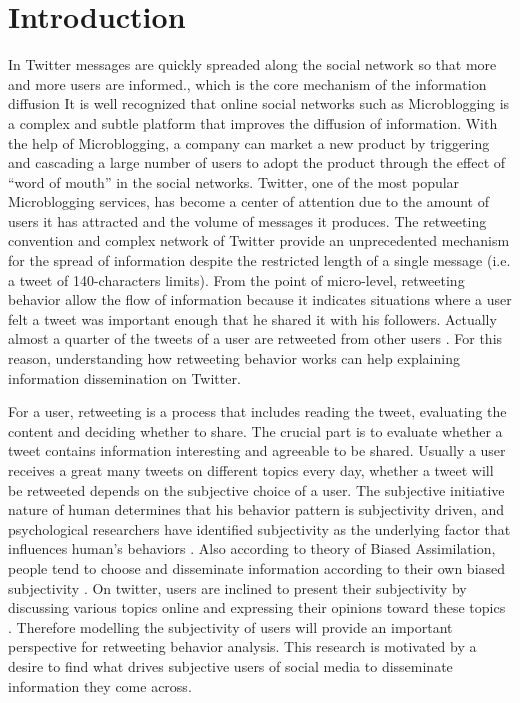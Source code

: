 \documentclass{acm_proc_article-sp}
\begin{document}
\section{Introduction}
\label{introduction}
\noindent 
In Twitter messages are quickly spreaded along the social network so that more and more users are informed., which is the core mechanism of the information diffusion
It is well recognized that online social networks such as Microblogging is a complex and subtle platform that improves the diffusion of information. With the help of Microblogging, a company can market a new product by triggering and cascading a large number of users to adopt the product through the effect of ``word of mouth'' in the social networks. Twitter, one of the most popular Microblogging services, has become a center of attention due to the amount of users it has attracted and the volume of messages it produces. 
The retweeting convention and complex network of Twitter provide an unprecedented mechanism for the spread of information despite the restricted length of a single message (i.e. a tweet of 140-characters limits). From the point of micro-level, retweeting behavior allow the flow of information because it indicates situations where a user felt a tweet was important enough that he shared it with his followers. Actually almost a quarter of the tweets of a user are retweeted from other users \cite{yang2010understanding}. For this reason, understanding how retweeting behavior works can help explaining information dissemination on Twitter.

For a user, retweeting is a process that includes reading the tweet, evaluating the content and deciding whether to share. The crucial part is to evaluate whether a tweet contains information interesting and agreeable to be shared. Usually a user receives a great many tweets on different topics every day, whether a tweet will be retweeted depends on the subjective choice of a user. The subjective initiative nature of human determines that his behavior pattern is subjectivity driven, and psychological researchers have identified subjectivity as the underlying factor that influences human's behaviors \cite{moore2008awareness}. Also according to theory of Biased Assimilation, people tend to choose and disseminate information according to their own biased subjectivity \cite{Hyman2000}. On twitter, users are inclined to present their subjectivity by discussing various topics online and expressing their opinions toward these topics \cite{calais2011bias}. Therefore modelling the subjectivity of users will provide an important perspective for retweeting behavior analysis. This research is motivated by a desire to find what drives subjective users of social media to disseminate information they come across. 
\end{document}
